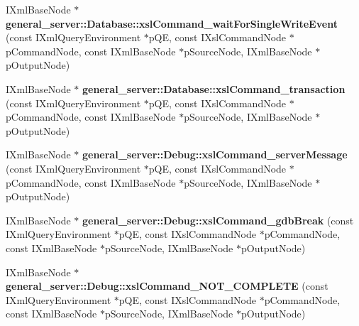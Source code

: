 \begin{DoxyCompactItemize}
\item 
\hypertarget{group__XSLModule-Commands_ga6d37d1c0b9f784350381cee223d718da}{\-I\-Xml\-Base\-Node $\ast$ {\bfseries general\-\_\-server\-::\-Database\-::xsl\-Command\-\_\-wait\-For\-Single\-Write\-Event} (const \-I\-Xml\-Query\-Environment $\ast$p\-Q\-E, const \-I\-Xsl\-Command\-Node $\ast$p\-Command\-Node, const \-I\-Xml\-Base\-Node $\ast$p\-Source\-Node, \-I\-Xml\-Base\-Node $\ast$p\-Output\-Node)}\label{group__XSLModule-Commands_ga6d37d1c0b9f784350381cee223d718da}

\item 
\hypertarget{group__XSLModule-Commands_gab2dddea30cfe8cb8c47ac25ac9c7f841}{\-I\-Xml\-Base\-Node $\ast$ {\bfseries general\-\_\-server\-::\-Database\-::xsl\-Command\-\_\-transaction} (const \-I\-Xml\-Query\-Environment $\ast$p\-Q\-E, const \-I\-Xsl\-Command\-Node $\ast$p\-Command\-Node, const \-I\-Xml\-Base\-Node $\ast$p\-Source\-Node, \-I\-Xml\-Base\-Node $\ast$p\-Output\-Node)}\label{group__XSLModule-Commands_gab2dddea30cfe8cb8c47ac25ac9c7f841}

\item 
\hypertarget{group__XSLModule-Commands_gac85d7f913e2f0c513cb70d7f182acac7}{\-I\-Xml\-Base\-Node $\ast$ {\bfseries general\-\_\-server\-::\-Debug\-::xsl\-Command\-\_\-server\-Message} (const \-I\-Xml\-Query\-Environment $\ast$p\-Q\-E, const \-I\-Xsl\-Command\-Node $\ast$p\-Command\-Node, const \-I\-Xml\-Base\-Node $\ast$p\-Source\-Node, \-I\-Xml\-Base\-Node $\ast$p\-Output\-Node)}\label{group__XSLModule-Commands_gac85d7f913e2f0c513cb70d7f182acac7}

\item 
\hypertarget{group__XSLModule-Commands_ga368a459f34d22a2ed966877e93af86f8}{\-I\-Xml\-Base\-Node $\ast$ {\bfseries general\-\_\-server\-::\-Debug\-::xsl\-Command\-\_\-gdb\-Break} (const \-I\-Xml\-Query\-Environment $\ast$p\-Q\-E, const \-I\-Xsl\-Command\-Node $\ast$p\-Command\-Node, const \-I\-Xml\-Base\-Node $\ast$p\-Source\-Node, \-I\-Xml\-Base\-Node $\ast$p\-Output\-Node)}\label{group__XSLModule-Commands_ga368a459f34d22a2ed966877e93af86f8}

\item 
\hypertarget{group__XSLModule-Commands_gaa0c167a84041909ba1dc988540ff7d8e}{\-I\-Xml\-Base\-Node $\ast$ {\bfseries general\-\_\-server\-::\-Debug\-::xsl\-Command\-\_\-\-N\-O\-T\-\_\-\-C\-O\-M\-P\-L\-E\-T\-E} (const \-I\-Xml\-Query\-Environment $\ast$p\-Q\-E, const \-I\-Xsl\-Command\-Node $\ast$p\-Command\-Node, const \-I\-Xml\-Base\-Node $\ast$p\-Source\-Node, \-I\-Xml\-Base\-Node $\ast$p\-Output\-Node)}\label{group__XSLModule-Commands_gaa0c167a84041909ba1dc988540ff7d8e}


\end{DoxyCompactItemize}
